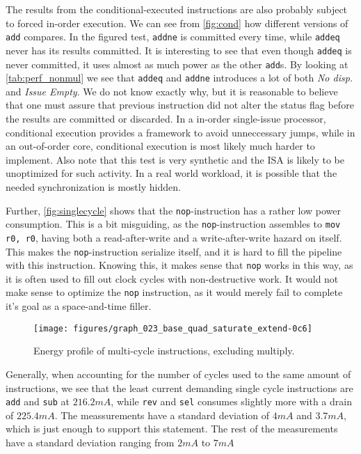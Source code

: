 The results from the conditional-executed instructions are also probably subject
to forced in-order execution. We can see from \autoref{fig:cond} how different
versions of \texttt{add} compares. In the figured test, \texttt{addne} is
committed every time, while \texttt{addeq} never has its results committed. It
is interesting to see that even though \texttt{addeq} is never committed, it
uses almost as much power as the other \texttt{add}s. By looking at
\autoref{tab:perf_nonmul} we see that \texttt{addeq} and \texttt{addne}
introduces a lot of both \emph{No disp.} and \emph{Issue Empty}. We do not know
exactly why, but it is reasonable to believe that one must assure that previous
instruction did not alter the status flag before the results are committed or
discarded. In a in-order single-issue processor, conditional execution provides
a framework to avoid unneccessary jumps, while in an out-of-order core,
conditional execution is most likely much harder to implement.  Also note that
this test is very synthetic and the ISA is likely to be unoptimized for such
activity. In a real world workload, it is possible that the needed
synchronization is mostly hidden.

Further, \autoref{fig:singlecycle} shows that the \texttt{nop}-instruction has a
rather low power consumption. This is a bit misguiding, as the
\texttt{nop}-instruction assembles to \texttt{mov r0, r0}, having both a
read-after-write and a write-after-write hazard on itself. This makes the
\texttt{nop}-instruction serialize itself, and it is hard to fill the pipeline
with this instruction.  Knowing this, it makes sense that \texttt{nop} works in
this way, as it is often used to fill out clock cycles with non-destructive
work. It would not make sense to optimize the \texttt{nop} instruction, as it
would merely fail to complete it's goal as a space-and-time filler.

\begin{figure}
    \centering
    \texttt{[image: figures/graph\_023\_base\_quad\_saturate\_extend-0c6]}
    \caption{Energy profile of multi-cycle instructions, excluding multiply.}
    \label{fig:multicycle}
\end{figure}

Generally, when accounting for the number of cycles used to the same amount of
instructions, we see that the least current demanding single cycle instructions
are \texttt{add} and \texttt{sub} at $216.2mA$, while \texttt{rev} and
\texttt{sel} consumes slightly more with a drain of $225.4mA$. The meassurements
have a standard deviation of $4mA$ and $3.7mA$, which is just enough to support
this statement. The rest of the measurements have a standard deviation ranging
from $2mA$ to $7mA$

